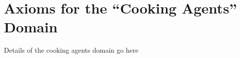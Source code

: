 \chapter{Axioms for the {}``Cooking Agents'' Domain}\label{ch:cookingagents}

Details of the cooking agents domain go here

